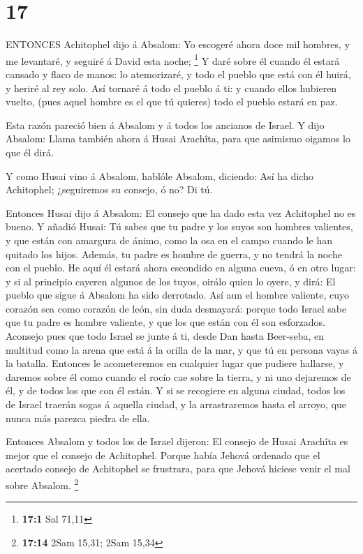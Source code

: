 \hypertarget{section-16}{%
\section{17}\label{section-16}}

 ENTONCES Achitophel dijo á Absalom: Yo escogeré ahora doce
mil hombres, y me levantaré, y seguiré á David esta noche; \footnote{\textbf{17:1}
  Sal 71,11}  Y daré sobre él cuando él estará cansado y
flaco de manos: lo atemorizaré, y todo el pueblo que está con él huirá,
y heriré al rey solo.  Así tornaré á todo el pueblo á ti: y
cuando ellos hubieren vuelto, (pues aquel hombre es el que tú quieres)
todo el pueblo estará en paz.

 Esta razón pareció bien á Absalom y á todos los ancianos de
Israel.  Y dijo Absalom: Llama también ahora á Husai
Arachîta, para que asimismo oigamos lo que él dirá.

 Y como Husai vino á Absalom, hablóle Absalom, diciendo: Así
ha dicho Achitophel; ¿seguiremos su consejo, ó no? Di tú.

 Entonces Husai dijo á Absalom: El consejo que ha dado esta
vez Achitophel no es bueno.  Y añadió Husai: Tú sabes que tu
padre y los suyos son hombres valientes, y que están con amargura de
ánimo, como la osa en el campo cuando le han quitado los hijos. Además,
tu padre es hombre de guerra, y no tendrá la noche con el pueblo.
 He aquí él estará ahora escondido en alguna cueva, ó en
otro lugar: y si al principio cayeren algunos de los tuyos, oirálo quien
lo oyere, y dirá: El pueblo que sigue á Absalom ha sido derrotado.
 Así aun el hombre valiente, cuyo corazón sea como corazón
de león, sin duda desmayará: porque todo Israel sabe que tu padre es
hombre valiente, y que los que están con él son esforzados.
 Aconsejo pues que todo Israel se junte á ti, desde Dan
hasta Beer-seba, en multitud como la arena que está á la orilla de la
mar, y que tú en persona vayas á la batalla.  Entonces le
acometeremos en cualquier lugar que pudiere hallarse, y daremos sobre él
como cuando el rocío cae sobre la tierra, y ni uno dejaremos de él, y de
todos los que con él están.  Y si se recogiere en alguna
ciudad, todos los de Israel traerán sogas á aquella ciudad, y la
arrastraremos hasta el arroyo, que nunca más parezca piedra de ella.

 Entonces Absalom y todos los de Israel dijeron: El consejo
de Husai Arachîta es mejor que el consejo de Achitophel. Porque había
Jehová ordenado que el acertado consejo de Achitophel se frustrara, para
que Jehová hiciese venir el mal sobre Absalom. \footnote{\textbf{17:14}
  2Sam 15,31; 2Sam 15,34}

